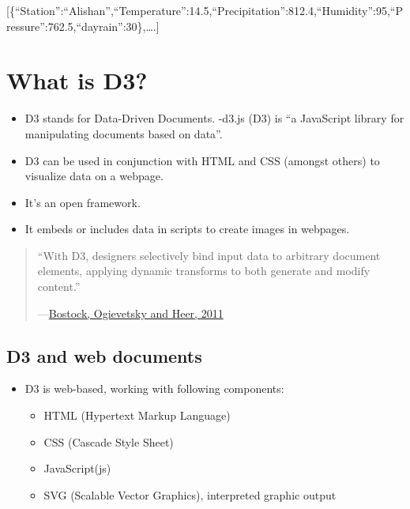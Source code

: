 \documentclass[]{book}
\providecommand{\tightlist}{%
  \setlength{\itemsep}{0pt}\setlength{\parskip}{0pt}}
\begin{document}
{[}\{``Station'':``Alishan'',``Temperature'':14.5,``Precipitation'':812.4,``Humidity'':95,``Pressure'':762.5,``dayrain'':30\},\ldots.{]}

\hypertarget{what-is-d3}{%
\section{What is D3?}\label{what-is-d3}}

\begin{itemize}
\tightlist
\item
  D3 stands for Data-Driven Documents.
  -d3.js (D3) is ``a JavaScript library for manipulating documents based on data''.
\item
  D3 can be used in conjunction with HTML and CSS (amongst others) to visualize data on a webpage.
\item
  It's an open framework.
\item
  It embeds or includes data in scripts to create images in webpages.
\end{itemize}

\begin{quote}
``With D3, designers selectively bind input data to arbitrary document elements, applying dynamic transforms to both generate and modify content.''

---\href{https://data3.mprog.nl/course/15\%20Readings/60\%20Reading\%206/Bostock_D3.pdf}{Bostock, Ogievetsky and Heer, 2011}
\end{quote}

\hypertarget{d3-and-web-documents}{%
\subsection{D3 and web documents}\label{d3-and-web-documents}}

\begin{itemize}
\tightlist
\item
  D3 is web-based, working with following components:

  \begin{itemize}
  \tightlist
  \item
    HTML (Hypertext Markup Language)
  \item
    CSS (Cascade Style Sheet)
  \item
    JavaScript(js)
  \item
    SVG (Scalable Vector Graphics), interpreted graphic output
  \end{itemize}
\end{itemize}
\end{document}
